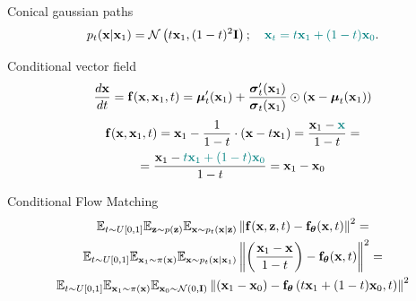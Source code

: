 \begin{frame}{Conical gaussian paths}
	\vspace{-0.3cm}
	\[
		p_t(\mathbf{x} | \mathbf{x}_1) = \mathcal{N}\left(t \mathbf{x}_1, (1-t)^2 \mathbf{I}\right); \quad {\color{teal}\mathbf{x}_t = t \mathbf{x}_1 + (1 - t) \mathbf{x}_0}. 
	\]
	\vspace{-0.5cm}
	\begin{block}{Conditional vector field}
		\vspace{-0.3cm}
		\[
			 \frac{d\mathbf{x}}{dt} = \mathbf{f}(\mathbf{x}, \mathbf{x}_1, t) =  \boldsymbol{\mu}_t'(\mathbf{x}_1) + \frac{\boldsymbol{\sigma}_t'(\mathbf{x}_1)}{\boldsymbol{\sigma}_t(\mathbf{x}_1)} \odot (\mathbf{x} - \boldsymbol{\mu}_t(\mathbf{x}_1))
		\]
		\vspace{-0.5cm}
		\begin{multline*}
			\mathbf{f}(\mathbf{x}, \mathbf{x}_1, t) = \mathbf{x}_1 - \frac{1}{1-t} \cdot (\mathbf{x} - t \mathbf{x}_1) = \frac{\mathbf{x}_1 - {\color{teal}\mathbf{x}}}{1-t} = \\
			= \frac{\mathbf{x}_1 - {\color{teal}t \mathbf{x}_1 + (1 - t) \mathbf{x}_0}}{1-t} = \mathbf{x}_1 - \mathbf{x}_0
		\end{multline*}
		\vspace{-0.7cm}
	\end{block}
	\begin{block}{Conditional Flow Matching}
		\vspace{-0.7cm}
		\begin{multline*}
			\mathbb{E}_{t \sim U[0, 1]} \mathbb{E}_{\mathbf{z} \sim p(\mathbf{z})} \mathbb{E}_{\mathbf{x} \sim p_t(\mathbf{x} | \mathbf{z})}\left\| \mathbf{f}(\mathbf{x}, \mathbf{z}, t) - \mathbf{f}_{\boldsymbol{\theta}}(\mathbf{x}, t) \right\|^2 = \\
		 \mathbb{E}_{t \sim U[0, 1]} \mathbb{E}_{\mathbf{x}_1 \sim \pi(\mathbf{x})} \mathbb{E}_{\mathbf{x} \sim p_t(\mathbf{x} | \mathbf{x}_1)}\left\| \left(\frac{\mathbf{x}_1 - \mathbf{x}}{1-t}\right) - \mathbf{f}_{\boldsymbol{\theta}}(\mathbf{x}, t) \right\|^2 = \\
		 \mathbb{E}_{t \sim U[0, 1]} \mathbb{E}_{\mathbf{x}_1 \sim \pi(\mathbf{x})} \mathbb{E}_{\mathbf{x}_0 \sim \mathcal{N}(0, \mathbf{I})}\left\| (\mathbf{x}_1 - \mathbf{x}_0) - \mathbf{f}_{\boldsymbol{\theta}}\left(t \mathbf{x}_1 + (1 - t) \mathbf{x}_0, t\right) \right\|^2
		\end{multline*}
		\vspace{-0.5cm}
	\end{block}	
\end{frame}
